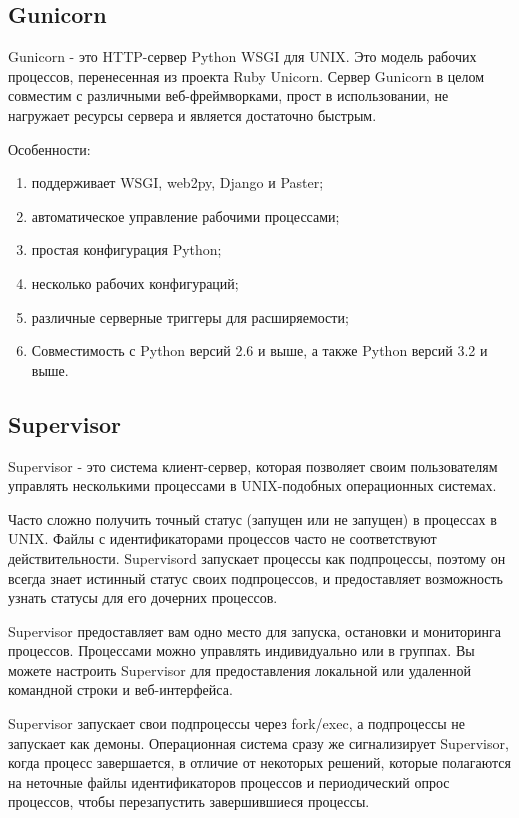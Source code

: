 \subsection{Gunicorn}
\label{sec:development:gunicorn}

Gunicorn - это HTTP-сервер Python WSGI для UNIX. Это модель рабочих процессов, перенесенная из проекта Ruby Unicorn. Сервер Gunicorn в целом совместим с различными веб-фреймворками, прост в использовании, не нагружает ресурсы сервера и является достаточно быстрым.

Особенности:
\begin{enumerate}
  \item поддерживает WSGI, web2py, Django и Paster;
  \item автоматическое управление рабочими процессами;
  \item простая конфигурация Python;
  \item несколько рабочих конфигураций;
  \item различные серверные триггеры для расширяемости;
  \item Совместимость с Python версий 2.6 и выше, а также Python версий 3.2 и выше.
\end{enumerate}

\subsection{Supervisor}
\label{sec:development:supervisor}

Supervisor - это система клиент-сервер, которая позволяет своим пользователям управлять несколькими процессами в UNIX-подобных операционных системах.

Часто сложно получить точный статус (запущен или не запущен) в процессах в UNIX. Файлы с идентификаторами процессов часто не соответствуют действительности. Supervisord запускает процессы как подпроцессы, поэтому он всегда знает истинный статус своих подпроцессов, и предоставляет возможность узнать статусы для его дочерних процессов.

Supervisor предоставляет вам одно место для запуска, остановки и мониторинга процессов. Процессами можно управлять индивидуально или в группах. Вы можете настроить Supervisor для предоставления локальной или удаленной командной строки и веб-интерфейса.

Supervisor запускает свои подпроцессы через fork/exec, а подпроцессы не запускает как демоны. Операционная система сразу же сигнализирует Supervisor, когда процесс завершается, в отличие от некоторых решений, которые полагаются на неточные файлы идентификаторов процессов и периодический опрос процессов, чтобы перезапустить завершившиеся процессы.

